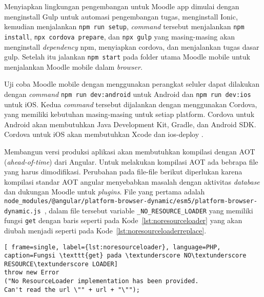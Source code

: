 Menyiapkan lingkungan pengembangan untuk Moodle app dimulai dengan menginstall Gulp untuk automasi pengembangan tugas, menginstall Ionic, kemudian menjalankan \texttt{npm run setup}, \textit{command} tersebut menjalankan \texttt{npm install}, \texttt{npx cordova prepare}, dan \texttt{npx gulp} yang masing-masing akan menginstall \textit{dependency} npm, menyiapkan cordova, dan menjalankan tugas dasar gulp. Setelah itu jalankan \texttt{npm start} pada folder utama Moodle mobile untuk menjalankan Moodle mobile dalam \textit{browser}.

Uji coba Moodle mobile dengan menggunakan perangkat seluler dapat dilakukan dengan \textit{command} \texttt{npm run dev:android} untuk Android dan \texttt{npm run dev:ios} untuk iOS. Kedua \textit{command} tersebut dijalankan dengan menggunakan Cordova, yang memiliki kebutuhan masing-masing untuk setiap platform. Cordova untuk Android akan membutuhkan Java Development Kit, Gradle, dan Android SDK\cite{cordova:android}. Cordova untuk iOS akan membutuhkan Xcode dan ios-deploy \cite{cordova:iOS}.

Membangun versi produksi aplikasi akan membutuhkan kompilasi dengan AOT (\textit{ahead-of-time}) dari Angular. Untuk melakukan kompilasi AOT ada bebrapa file yang harus dimodifikasi. Perubahan pada file-file berikut diperlukan karena kompilasi standar AOT angular menyebabkan masalah dengan aktivitas \textit{database} dan dukungan Moodle untuk \textit{plugins}.  File yang pertama adalah \texttt{node\_modules/@angular/platform-browser-dynamic/esm5/platform-browser-dynamic.js }, dalam file tersebut variable \texttt{\_NO\_RESOURCE\_LOADER} yang memiliki fungsi \texttt{get} dengan baris seperti pada \mbox{Kode \ref{lst:noresourceloader}} yang akan diubah menjadi seperti pada \mbox{Kode \ref{lst:noresourceloaderreplace}}.\cite{moodle:dev}

\begin{lstlisting}[ frame=single, label={lst:noresourceloader}, language=PHP, caption=Fungsi \texttt{get} pada \textunderscore NO\textunderscore RESOURCE\textunderscore LOADER]
throw new Error
("No ResourceLoader implementation has been provided. 
Can't read the url \"" + url + "\"");
\end{lstlisting}

